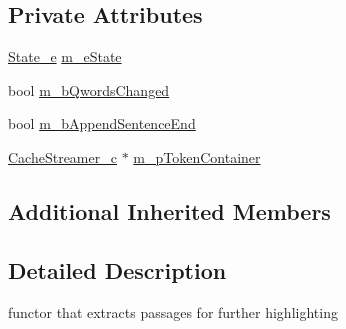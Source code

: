 \subsection*{Private Attributes}
\begin{DoxyCompactItemize}
\item 
\hyperlink{classExtractExcerpts__c_a393a79623916648bf0ca6d34fcd784e0}{State\-\_\-e} \hyperlink{classExtractExcerpts__c_a6dfa8c0bc046ebf1774573188a862a6f}{m\-\_\-e\-State}
\item 
bool \hyperlink{classExtractExcerpts__c_adf9f1c150c58be2501dcd00e71c5166c}{m\-\_\-b\-Qwords\-Changed}
\item 
bool \hyperlink{classExtractExcerpts__c_ac710a1fe715fd94dd7fe56211c0e0a0a}{m\-\_\-b\-Append\-Sentence\-End}
\item 
\hyperlink{classCacheStreamer__c}{Cache\-Streamer\-\_\-c} $\ast$ \hyperlink{classExtractExcerpts__c_a827c5a10b3ba16498b2d239487d5cc95}{m\-\_\-p\-Token\-Container}
\end{DoxyCompactItemize}
\subsection*{Additional Inherited Members}


\subsection{Detailed Description}
functor that extracts passages for further highlighting 

